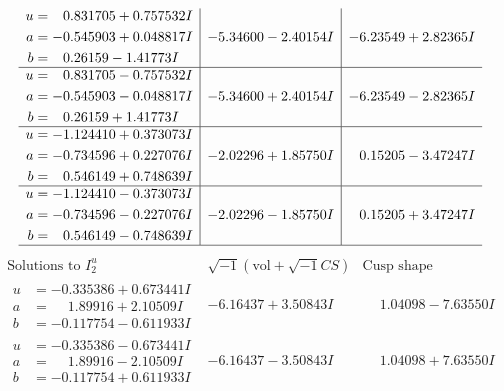 \documentclass[1p]{elsarticle_modified}
\theoremstyle{definition}
\newcommand{\I}{\sqrt{-1}}
\begin{document}
$$\begin{array}{c|c|c}
\begin{aligned}
u &= \phantom{-}0.831705 + 0.757532 I \\
a &= -0.545903 + 0.048817 I \\
b &= \phantom{-}0.26159 - 1.41773 I\end{aligned}
 & -5.34600 - 2.40154 I & -6.23549 + 2.82365 I \\ \hline\begin{aligned}
u &= \phantom{-}0.831705 - 0.757532 I \\
a &= -0.545903 - 0.048817 I \\
b &= \phantom{-}0.26159 + 1.41773 I\end{aligned}
 & -5.34600 + 2.40154 I & -6.23549 - 2.82365 I \\ \hline\begin{aligned}
u &= -1.124410 + 0.373073 I \\
a &= -0.734596 + 0.227076 I \\
b &= \phantom{-}0.546149 + 0.748639 I\end{aligned}
 & -2.02296 + 1.85750 I & \phantom{-}0.15205 - 3.47247 I \\ \hline\begin{aligned}
u &= -1.124410 - 0.373073 I \\
a &= -0.734596 - 0.227076 I \\
b &= \phantom{-}0.546149 - 0.748639 I\end{aligned}
 & -2.02296 - 1.85750 I & \phantom{-}0.15205 + 3.47247 I\\
 \hline 
 \end{array}$$\newpage$$\begin{array}{c|c|c}  
\text{Solutions to }I^u_{2}& \I (\text{vol} + \sqrt{-1}CS) & \text{Cusp shape}\\
 \hline 
\begin{aligned}
u &= -0.335386 + 0.673441 I \\
a &= \phantom{-}1.89916 + 2.10509 I \\
b &= -0.117754 - 0.611933 I\end{aligned}
 & -6.16437 + 3.50843 I & \phantom{-}1.04098 - 7.63550 I \\ \hline\begin{aligned}
u &= -0.335386 - 0.673441 I \\
a &= \phantom{-}1.89916 - 2.10509 I \\
b &= -0.117754 + 0.611933 I\end{aligned}
 & -6.16437 - 3.50843 I & \phantom{-}1.04098 + 7.63550 I \\ \hline\begin{aligned}

\end{aligned}
\end{array}$$
\end{document}
